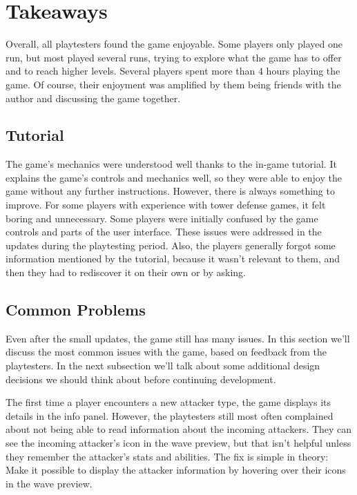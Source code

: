 \section{Takeaways}\label{sec:takeaways}

Overall, all playtesters found the game enjoyable.
Some players only played one run, but most played several runs, trying to explore what the game has to offer and to reach higher levels.
Several players spent more than 4 hours playing the game.
Of course, their enjoyment was amplified by them being friends with the author and discussing the game together.

\subsection{Tutorial}\label{sec:playtest-tutorial}
The game's mechanics were understood well thanks to the in-game tutorial.
It explains the game's controls and mechanics well, so they were able to enjoy the game without any further instructions.
However, there is always something to improve.
For some players with experience with tower defense games, it felt boring and unnecessary.
Some players were initially confused by the game controls and parts of the user interface.
These issues were addressed in the updates during the playtesting period.
Also, the players generally forgot some information mentioned by the tutorial, because it wasn't relevant to them, and then they had to rediscover it on their own or by asking.

\subsection{Common Problems}
Even after the small updates, the game still has many issues.
In this section we'll discuss the most common issues with the game, based on feedback from the playtesters.
In the next subsection we'll talk about some additional design decisions we should think about before continuing development.

The first time a player encounters a new attacker type, the game displays its details in the info panel.
However, the playtesters still most often complained about not being able to read information about the incoming attackers.
They can see the incoming attacker's icon in the wave preview, but that isn't helpful unless they remember the attacker's stats and abilities.
The fix is simple in theory:
Make it possible to display the attacker information by hovering over their icons in the wave preview.

